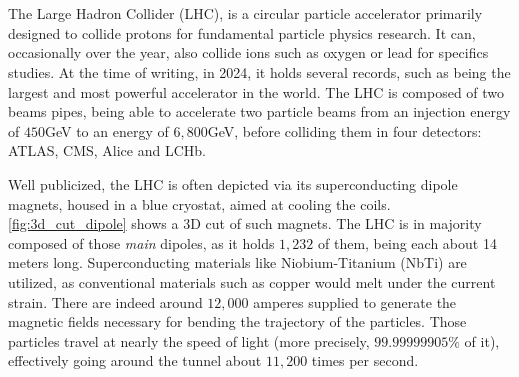 \section{}

\subsection{}


\lipsum[1]

\subsection{}

\lipsum[1]


\subsection{}

The Large Hadron Collider (LHC), is a circular particle accelerator primarily designed to collide
protons for fundamental particle physics research. It can, occasionally over the year, also collide
ions such as oxygen or lead for specifics studies. At the time of writing, in 2024, it holds several
records, such as being the largest and most powerful accelerator in the world. The LHC is composed
of two beams pipes, being able to accelerate two particle beams from an injection energy of $450$GeV
to an energy of $6,800$GeV, before colliding them in four detectors: ATLAS, CMS, Alice and LCHb.

Well publicized, the LHC is often depicted via its superconducting dipole magnets, housed in a blue
cryostat, aimed at cooling the coils. \cref{fig:3d_cut_dipole} shows a 3D cut of such magnets. The
LHC is in majority composed of those \textit{main} dipoles, as it holds $1,232$ of them, being each
about 14 meters long. Superconducting materials like Niobium-Titanium (NbTi) are utilized, as
conventional materials such as copper would melt under the current strain. There are indeed around
$12,000$ amperes supplied to generate the magnetic fields necessary for bending the trajectory of
the particles.
Those particles travel at nearly the speed of light (more precisely, $99.99999905\%$ of it),
effectively going around the tunnel about $11,200$ times per second.

